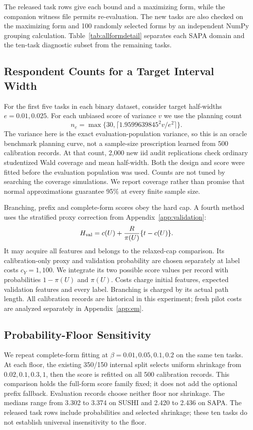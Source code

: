 The released task rows give each bound and a maximizing form, while the
companion witness file permits re-evaluation. The new tasks are also
checked on the maximizing form and 100 randomly selected forms by an
independent NumPy grouping calculation. Table~\ref{tab:allformdetail}
separates each SAPA domain and the ten-task diagnostic subset from the remaining tasks.



\subsection{Respondent Counts for a Target Interval Width}\label{app:precision}
For the first five tasks in each binary dataset, consider target half-widths $e=0.01,0.025$.
For each unbiased score of variance $v$ we use the planning count
\[
 n_e=\max\{30,\lceil 1.9599639845^2v/e^2\rceil\}.
\]
The variance here is the exact evaluation-population variance, so this is an
oracle benchmark planning curve, not a sample-size prescription learned
from 500 calibration records. At that count, 2,000 new iid audit replications
check ordinary studentized Wald coverage and mean half-width. Both the
design and score were fitted before the evaluation population was used.
Counts are not tuned by searching the coverage simulations. We report
coverage rather than promise that normal approximations guarantee 95\% at
every finite sample size.

Branching, prefix and complete-form scores obey the hard cap. A fourth
method uses the stratified proxy correction from Appendix~\ref{app:validation}:
\[
 H_{\rm val}=c(U)+\frac{R}{\pi(U)}\{t-c(U)\}.
\]
It may acquire all features and belongs to the relaxed-cap comparison.
Its calibration-only proxy and validation probability are chosen separately
at label costs $c_Y=1,100$. We integrate its two possible score values per
record with probabilities $1-\pi(U)$ and $\pi(U)$. Costs charge initial
features, expected validation features and every label. Branching is charged
by its actual path length. All calibration records are historical in this
experiment; fresh pilot costs are analyzed separately in Appendix~\ref{app:em}.



\subsection{Probability-Floor Sensitivity}\label{app:floor}
We repeat complete-form fitting at $\beta=0.01,0.05,0.1,0.2$ on the same ten
tasks. At each floor, the existing 350/150 internal split selects uniform
shrinkage from $0.02,0.1,0.3,1$, then the score is refitted on all 500
calibration records. This comparison holds the full-form score family fixed;
it does not add the optional prefix fallback. Evaluation records choose
neither floor nor shrinkage. The medians range from 3.302 to 3.374 on SUSHI
and 2.420 to 2.436 on SAPA. The released task rows include probabilities
and selected shrinkage; these ten tasks do not establish universal
insensitivity to the floor.

